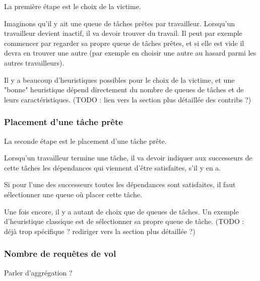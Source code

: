La première étape est le choix de la victime.

Imaginons qu'il y ait une queue de tâches prêtes par travailleur.
Lorsqu'un travailleur devient inactif, il va devoir trouver du travail.
Il peut par exemple commencer par regarder sa propre queue de tâches prêtes, et si elle est vide il devra en trouver une autre (par exemple en choisir une autre au hasard parmi les autres travailleurs).

Il y a beaucoup d'heuristiques possibles pour le choix de la victime, et une "bonne" heuristique dépend directement du nombre de queues de tâches et de leurs caractéristiques.
(TODO : lien vers la section plus détaillée des contribs ?)

\subsubsection{Placement d'une tâche prête}

La seconde étape est le placement d'une tâche prête.

Lorsqu'un travailleur termine une tâche, il va devoir indiquer aux successeurs de cette tâches les dépendances qui viennent d'être satisfaites, s'il y en a.

Si pour l'une des successeurs toutes les dépendances sont satisfaites, il faut sélectionner une queue où placer cette tâche.

Une fois encore, il y a autant de choix que de queues de tâches. Un exemple d'heuristique classique est de sélectionner sa propre queue de tâche.
(TODO : déjà trop spécifique ? rediriger vers la section plus détaillée ?)

\subsubsection{Nombre de requêtes de vol}

Parler d'aggrégation ?


